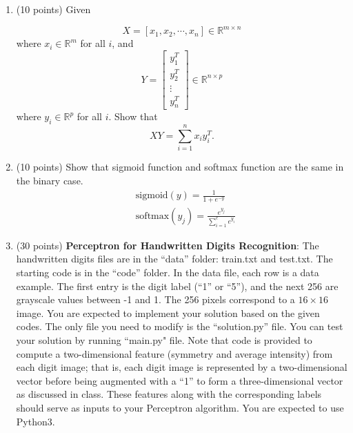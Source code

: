 \documentclass[11pt]{article}
\begin{document}
\begin{enumerate}
\begin{enumerate}
\end{enumerate}

\item (10 points) Given

$$X=[x_1,x_2,\cdots,x_n]\in\mathbb{R}^{m\times n}$$
where
$x_i\in\mathbb{R}^m$ for all $i$, and
$$Y=\begin{bmatrix}
    y_1^T       \\
    y_2^T       \\
    \vdots\\
    y_n^T
\end{bmatrix}\in\mathbb{R}^{n\times p}$$
where $y_i\in\mathbb{R}^p$ for all $i$. Show that $$XY=\sum_{i=1}^n
x_i y_i^T.$$


\item (10 points) Show that sigmoid function and
softmax function are the same in the binary case.
\begin{align*}
    &\mbox{sigmoid}(y) = \frac{1}{1 + e^{-y}}\\
    &\mbox{softmax}(y_j) = \frac{e^{y_j}}{\sum_{i=1}^c e^{y_i}} 
\end{align*}

\item (30 points) \textbf{Perceptron for Handwritten Digits Recognition}:
The handwritten digits files are in the ``data'' folder: train.txt
and test.txt. The starting code is in the ``code'' folder. In the
data file, each row is a data example. The first entry is the digit
label (``1'' or ``5''), and the next 256 are grayscale values
between -1 and 1. The 256 pixels correspond to a $16\times16$ image.
You are expected to implement your solution based on the given
codes. The only file you need to modify is the ``solution.py'' file.
You can test your solution by running ``main.py" file. Note that
code is provided to compute a two-dimensional feature (symmetry and
average intensity) from each digit image; that is, each digit image
is represented by a two-dimensional vector before being augmented
with a ``1'' to form a three-dimensional vector as discussed in
class. These features along with the corresponding labels should
serve as inputs to your Perceptron algorithm.
{\color{red}You are expected to use Python3.}


\end{enumerate}
\end{document}
